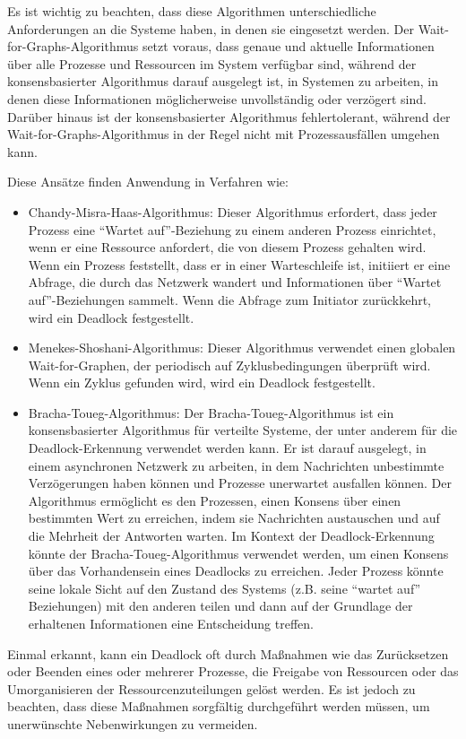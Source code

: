 Es ist wichtig zu beachten, dass diese Algorithmen unterschiedliche Anforderungen an die Systeme haben, in denen sie eingesetzt werden. Der Wait-for-Graphs-Algorithmus setzt voraus, dass genaue und aktuelle Informationen über alle Prozesse und Ressourcen im System verfügbar sind, während der konsensbasierter Algorithmus darauf ausgelegt ist, in Systemen zu arbeiten, in denen diese Informationen möglicherweise unvollständig oder verzögert sind. Darüber hinaus ist der konsensbasierter Algorithmus fehlertolerant, während der Wait-for-Graphs-Algorithmus in der Regel nicht mit Prozessausfällen umgehen kann.	

Diese Ansätze finden Anwendung in Verfahren wie:

\begin{itemize}
\item Chandy-Misra-Haas-Algorithmus: Dieser Algorithmus erfordert, dass jeder Prozess eine \enquote{Wartet auf}-Beziehung zu einem anderen Prozess einrichtet, wenn er eine Ressource anfordert, die von diesem Prozess gehalten wird. Wenn ein Prozess feststellt, dass er in einer Warteschleife ist, initiiert er eine Abfrage, die durch das Netzwerk wandert und Informationen über \enquote{Wartet auf}-Beziehungen sammelt. Wenn die Abfrage zum Initiator zurückkehrt, wird ein Deadlock festgestellt.
\item Menekes-Shoshani-Algorithmus: Dieser Algorithmus verwendet einen globalen Wait-for-Graphen, der periodisch auf Zyklusbedingungen überprüft wird. Wenn ein Zyklus gefunden wird, wird ein Deadlock festgestellt.
\item Bracha-Toueg-Algorithmus: Der Bracha-Toueg-Algorithmus ist ein konsensbasierter Algorithmus für verteilte Systeme, der unter anderem für die Deadlock-Erkennung verwendet werden kann. Er ist darauf ausgelegt, in einem asynchronen Netzwerk zu arbeiten, in dem Nachrichten unbestimmte Verzögerungen haben können und Prozesse unerwartet ausfallen können. Der Algorithmus ermöglicht es den Prozessen, einen Konsens über einen bestimmten Wert zu erreichen, indem sie Nachrichten austauschen und auf die Mehrheit der Antworten warten. Im Kontext der Deadlock-Erkennung könnte der Bracha-Toueg-Algorithmus verwendet werden, um einen Konsens über das Vorhandensein eines Deadlocks zu erreichen. Jeder Prozess könnte seine lokale Sicht auf den Zustand des Systems (z.B. seine \enquote{wartet auf} Beziehungen) mit den anderen teilen und dann auf der Grundlage der erhaltenen Informationen eine Entscheidung treffen.
\end{itemize}
Einmal erkannt, kann ein Deadlock oft durch Maßnahmen wie das Zurücksetzen oder Beenden eines oder mehrerer Prozesse, die Freigabe von Ressourcen oder das Umorganisieren der Ressourcenzuteilungen gelöst werden. Es ist jedoch zu beachten, dass diese Maßnahmen sorgfältig durchgeführt werden müssen, um unerwünschte Nebenwirkungen zu vermeiden.

